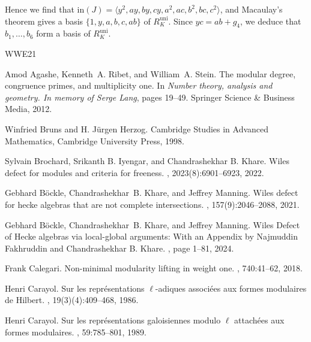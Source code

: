 \documentclass[a4paper, notitlepage, 10pt]{amsart}
\theoremstyle{plain} %
\theoremstyle{definition} %
\theoremstyle{remark} %
\numberwithin{equation}{section}
\newcommand{\uni}{\operatorname{uni}}
\begin{document}
Hence we find that $\mathrm{in}(J)=\langle y^2,ay,by,cy,a^2,ac,b^2,bc,c^2\rangle$, and Macaulay's theorem gives a basis $\{1,y,a,b,c,ab\}$ of $R^{\uni}_K$. Since $yc=ab+g_4$, we deduce that $b_1,\dots,b_6$ form a basis of $R^{\uni}_K$.


%

%
\begin{thebibliography}{WWE21}

Amod Agashe, Kenneth~A. Ribet, and William~A. Stein.
\newblock The modular degree, congruence primes, and multiplicity one.
\newblock In {\em Number theory, analysis and geometry. In memory of Serge Lang}, pages 19--49. Springer Science \& Business Media, 2012.

Winfried Bruns and H. Jürgen Herzog.
\newblock Cambridge Studies in Advanced Mathematics, Cambridge University Press, 1998.

Sylvain Brochard,  Srikanth B. Iyengar, and Chandrashekhar B. Khare.
\newblock Wiles defect for modules and criteria for freeness.
, 2023(8):6901--6923, 2022.

Gebhard Böckle, Chandrashekhar~B. Khare, and Jeffrey Manning.
\newblock Wiles defect for {h}ecke algebras that are not complete intersections.
, 157(9):2046--2088, 2021.

Gebhard Böckle, Chandrashekhar~B. Khare, and Jeffrey Manning.
\newblock Wiles {D}efect of {H}ecke algebras via local-global arguments: With an {A}ppendix by {N}ajmuddin {F}akhruddin and {C}handrashekhar {B}. {K}hare.
, page 1–81, 2024.

Frank Calegari.
\newblock Non-minimal modularity lifting in weight one.
, 740:41--62, 2018.

Henri Carayol.
\newblock Sur les représentations $\ell$-adiques associées aux formes modulaires de Hilbert.
, 19(3)(4):409–468, 1986.

Henri Carayol.
\newblock Sur les représentations galoisiennes modulo $\ell$ attachées aux formes modulaires.
, 59:785--801, 1989.


\end{thebibliography}
\end{document}
